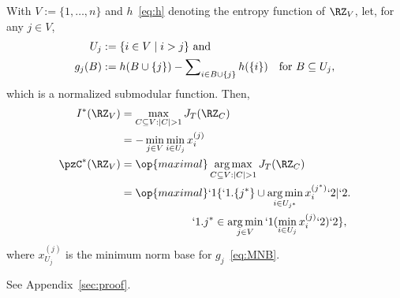 \begin{Theorem}
	\label{thm:JT}
	With $V:= \{1,\ldots, n\}$ and $h$~\eqref{eq:h} denoting the entropy function of $\RZ_V$, let,
	for any $j\in V$,
	\begin{align*}
		U_j &:=\Set {i\in V\mid i>j} \kern0em \text{ and } \\ %
	g_j(B) &:= h(B\cup \Set {j})-\sum\nolimits_{i\in B\cup \Set {j}} h(\Set {i}) \kern1em \text {for }B\subseteq U_j,
	\end{align*}
	which is a normalized submodular function. Then,
	\begin{subequations}
		\begin{align}
		I^*(\RZ_V)&=\max_{C\subseteq V:\abs{C}> 1} J_{T}(\RZ_C) \label{eq:maxJT}\\
		&= -\min_{j\in V} \min_{i\in U_j} x^{(j)}_i \label{eq:maxJT:x}\\ \nextParentEquation
		\pzC^*(\RZ_V)&=\op{maximal}
		\argmax_{C\subseteq V:\abs{C}> 1} J_{T}(\RZ_C)
		\label{eq:argmaxJT}\\
		&=\op{maximal} 
		`1\{`1.\Set{j^*}\cup 
		\argmin_{i\in U_{j^*}} x^{(j^*)}_i `2|`2.  \notag\\
		&\kern6.5em 
		`1.j^*\in \argmin_{j\in V} `1( \min_{i\in U_{j}} x^{(j)}_i `2)
		`2\},\label{eq:argmaxJT:x}
		\end{align}
	\end{subequations}
	where $x^{(j)}_{U_{j}}$ is the minimum norm base for $g_j$~\eqref{eq:MNB}.
\end{Theorem}
\begin{Proof}
	See Appendix~\ref{sec:proof}.
\end{Proof}


